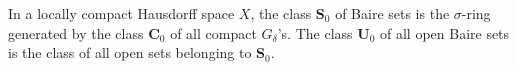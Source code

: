 In a locally compact Hausdorff space $X$, the class $\mathbf{S}_0$ of Baire sets is the $\sigma$-ring generated by the class $\mathbf{C}_0$ of all compact $G_{\delta}$'s. The class $\mathbf{U}_0$ of all open Baire sets is the class of all open sets belonging to $\mathbf{S}_0$.
